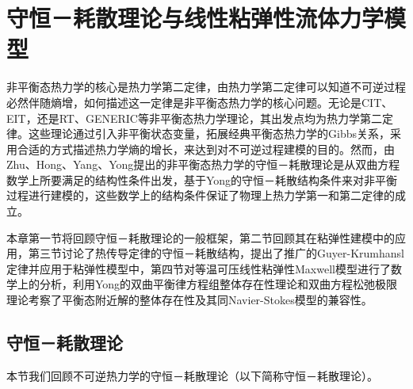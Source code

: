  \chapter{守恒－耗散理论与线性粘弹性流体力学模型}

 	非平衡态热力学的核心是热力学第二定律，由热力学第二定律可以知道不可逆过程必然伴随熵增，如何描述这一定律是非平衡态热力学的核心问题。无论是CIT、EIT，还是RT、GENERIC等非平衡态热力学理论，其出发点均为热力学第二定律。这些理论通过引入非平衡状态变量，拓展经典平衡态热力学的Gibbs关系，采用合适的方式描述热力学熵的增长，来达到对不可逆过程建模的目的\cite{ottinger2005beyond,jou1996extended}。然而，由Zhu、Hong、Yang、Yong提出的非平衡态热力学的守恒－耗散理论是从双曲方程数学上所要满足的结构性条件出发，基于Yong的守恒－耗散结构条件来对非平衡过程进行建模的，这些数学上的结构条件保证了物理上热力学第一和第二定律的成立\cite{zhu2014conservation}。
	
	本章第一节将回顾守恒－耗散理论的一般框架，第二节回顾其在粘弹性建模中的应用，第三节讨论了热传导定律的守恒－耗散结构，提出了推广的Guyer-Krumhansl定律并应用于粘弹性模型中，第四节对等温可压线性粘弹性Maxwell模型进行了数学上的分析，利用Yong的双曲平衡律方程组整体存在性理论和双曲方程松弛极限理论考察了平衡态附近解的整体存在性及其同Navier-Stokes模型的兼容性。

	\section{守恒－耗散理论}
	本节我们回顾不可逆热力学的守恒－耗散理论（以下简称守恒－耗散理论）\cite{zhu2014conservation}。

